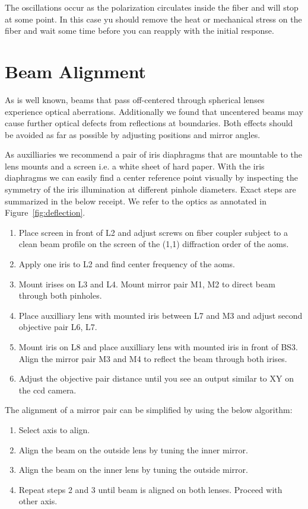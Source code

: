 The oscillations occur as the polarization circulates inside the fiber and
will stop at some point. In this case yu should remove the heat or mechanical 
stress on the fiber and wait some time before you can reapply with the initial
response.

\section{Beam Alignment}

As is well known, beams that pass off-centered through spherical lenses
experience optical aberrations. Additionally we found that uncentered beams
may cause further optical defects from reflections at boundaries. Both effects
should be avoided as far as possible by adjusting positions and mirror angles.

As auxilliaries we recommend a pair of iris diaphragms that are mountable to
the lens mounts and a screen i.e. a white sheet of hard paper. With the iris
diaphragms we can easily find a center reference point visually by inspecting
the symmetry of the iris illumination at different pinhole diameters. Exact
steps are summarized in the below receipt. We refer to the optics as annotated
in Figure~\ref{fig:deflection}.

\begin{enumerate}
  \item Place screen in front of L2 and adjust screws on fiber coupler subject
    to a clean beam profile on the screen of the (1,1) diffraction order of
    the \gls{aom}s.
  \item Apply one iris to L2 and find center frequency of the \gls{aom}s.
  \item Mount irises on L3 and L4. Mount mirror pair M1, M2 to direct beam
    through both pinholes.
  \item Place auxilliary lens with mounted iris between L7 and M3 and adjust
    second objective pair L6, L7.
  \item Mount iris on L8 and place auxilliary lens with mounted iris in front
    of BS3. Align the mirror pair M3 and M4 to reflect the beam through both
    irises.
  \item Adjust the objective pair distance until you see an output similar to
    XY on the \gls{ccd} camera.
\end{enumerate}

The alignment of a mirror pair can be simplified by using the below algorithm:

\begin{enumerate}
  \item Select axis to align.
  \item Align the beam on the outside lens by tuning the inner mirror.
  \item Align the beam on the inner lens by tuning the outside mirror.
  \item Repeat steps 2 and 3 until beam is aligned on both lenses. Proceed
    with other axis.
\end{enumerate}

